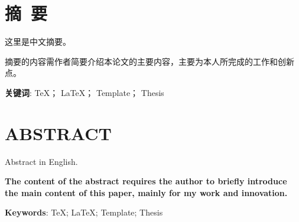 \newpage

\setcounter{page}{1} %

{
\let\clearpage\relax%
\chapter*{摘\ 要}
}

这里是中文摘要。

摘要的内容需作者简要介绍本论文的主要内容，主要为本人所完成的工作和创新
点。

\vspace{8mm}
\noindent \textbf{关键词}: \TeX； \LaTeX； Template； Thesis

\newpage
{
\let\clearpage\relax%
\chapter*{ABSTRACT}
}

Abstract in English.

\textbf{The content of the abstract requires the author to briefly introduce the main content of this paper, mainly for my work and innovation.}

\vspace{8mm}

\noindent \textbf{Keywords}: \TeX; \LaTeX; Template; Thesis
